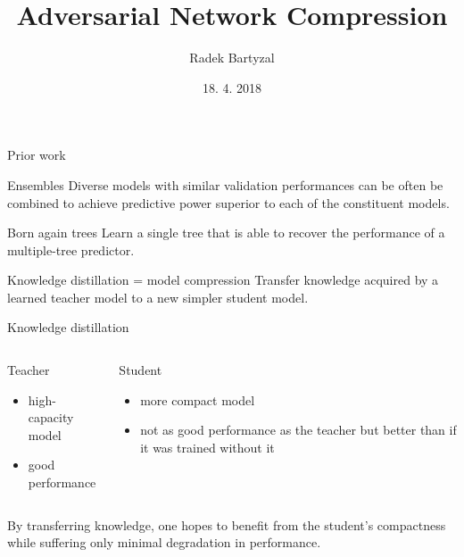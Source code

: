 \documentclass{beamer}
\begin{document}
\title{Adversarial Network Compression}  
\author{Radek Bartyzal}
\date{18. 4. 2018} 

\frame{\titlepage} 

\begin{frame}{Prior work}


\begin{block}{Ensembles}
Diverse models with similar validation performances can be often be combined to achieve predictive
power superior to each of the constituent models. \cite{cit:ensembles}
\end{block}

\begin{block}{Born again trees}
Learn a single tree that is able to recover the performance of a multiple-tree predictor. \cite{cit:bat}
\end{block}

\begin{block}{Knowledge distillation = model compression}
Transfer knowledge acquired by a learned
teacher model to a new simpler student model. \cite{cit:distill}
\end{block}



\end{frame}

\begin{frame}[t]{Knowledge distillation}

\begin{columns}[t]
\begin{column}{0.5\textwidth}
Teacher
\begin{itemize}
\item high-capacity model
\item good performance
\end{itemize}
\end{column}

\begin{column}{0.5\textwidth}
Student
\begin{itemize}
\item more compact model
\item not as good performance as the teacher but better than if it was trained without it
\end{itemize}
\end{column}

\end{columns}

\vfill
By transferring knowledge, one hopes to benefit from the student’s
compactness while suffering only minimal degradation in performance.

\end{frame}
\end{document}
